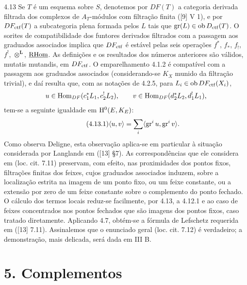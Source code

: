 \begin{statement}{4.13}
Se $T$ é um esquema sobre $S$, denotemos por $DF(T)$ a categoria derivada filtrada dos complexos de $A_T$-módulos com filtração finita ([9] V 1), e por $DF_{\mathrm{ctf}}(T)$ a subcategoria plena formada pelos $L$ tais que $\operatorname{gr}(L)\in\operatorname{ob}D_{\mathrm{ctf}}(T)$. O sorites de compatibilidade dos funtores derivados filtrados com a passagem aos graduados associados implica que $DF_{\mathrm{ctf}}$ é estável pelas seis operações $f^*$, $f_*$, $f_!$, $f^!$, $\otimes^{\mathbf L}$, $\underline{\mathrm{RHom}}$. As definições e os resultados dos números anteriores são válidos, mutatis mutandis, em $DF_{\mathrm{ctf}}$. O emparelhamento 4.1.2 é compatível com a passagem aos graduados associados (considerando-se $K_X$ munido da filtração trivial), e daí resulta que, com as notações de 4.2.5, para $L_i\in\operatorname{ob} DF_{\mathrm{ctf}}(X_i)$,
\[
u\in\operatorname{Hom}_{DF}(c_1^*L_1,c_2^!L_2),\qquad
v\in\operatorname{Hom}_{DF}(d_2^*L_2,d_1^!L_1),
\]
tem-se a seguinte igualdade em $\mathrm{H}^0(E,K_E)$:
\begin{equation}
\tag{4.13.1}
\langle u,v\rangle=\sum_i\langle \operatorname{gr}^i u,\operatorname{gr}^i v\rangle.
\end{equation}
Como observa Deligne, esta observação aplica-se em particular à situação considerada por Langlands em ([13] §7). As correspondências que ele considera em (loc. cit. 7.11) preservam, com efeito, nas proximidades dos pontos fixos, filtrações finitas dos feixes, cujos graduados associados induzem, sobre a localização estrita na imagem de um ponto fixo, ou um feixe constante, ou a extensão por zero de um feixe constante sobre o complemento do ponto fechado. O cálculo dos termos locais reduz-se facilmente, por 4.13, a 4.12.1 e ao caso de feixes concentrados nos pontos fechados que são imagens dos pontos fixos, caso tratado diretamente. Aplicando 4.7, obtém-se a fórmula de Lefschetz requerida em ([13] 7.11). Assinalemos que o enunciado geral (loc. cit. 7.12) é verdadeiro; a demonstração, mais delicada, será dada em III B.
\end{statement}



\section*{5. Complementos}
